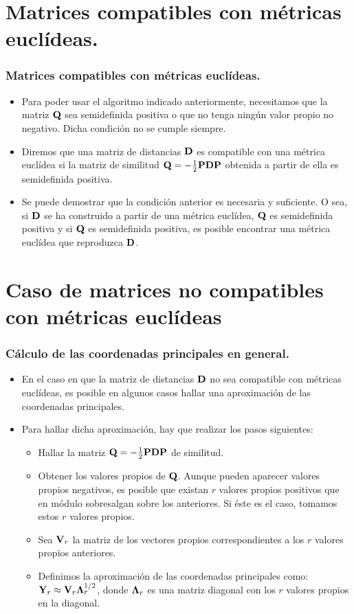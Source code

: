 \section{Matrices compatibles con métricas euclídeas.}
\begin{frame}
\frametitle{Matrices compatibles con métricas euclídeas.}
\begin{itemize}
\item<2->{Para poder usar el algoritmo indicado anteriormente, necesitamos que la matriz $\mathbf{Q}$ sea semidefinida positiva o que no tenga ningún valor propio no negativo. Dicha condición no se cumple siempre.}
\item<3->{Diremos que una matriz de distancias $\mathbf{D}$ es compatible con una métrica euclídea si la matriz de similitud $\mathbf{Q}=-\frac{1}{2}\mathbf{P}\mathbf{D}\mathbf{P}$ obtenida a partir de ella es semidefinida positiva.}
\item<4->{Se puede demostrar que la condición anterior es necesaria y suficiente. O sea, si $\mathbf{D}$ se ha construido a partir de una métrica euclídea, $\mathbf{Q}$ es semidefinida positiva y si $\mathbf{Q}$ es semidefinida positiva, es posible encontrar una métrica euclídea que reproduzca $\mathbf{D}$.}
\end{itemize}
\end{frame}
\section{Caso de matrices no compatibles con métricas euclídeas}
\begin{frame}
\frametitle{Cálculo de las coordenadas principales en general.}
\begin{itemize}
\item<2->{En el caso en que la matriz de distancias $\mathbf{D}$ no sea compatible con métricas euclídeas, es posible en algunos casos hallar una aproximación de las coordenadas principales.}
\item<3->{Para hallar dicha aproximación, hay que realizar los pasos siguientes:}
\begin{itemize}
\item<4->{Hallar la matriz $\mathbf{Q}=-\frac{1}{2}\mathbf{P}\mathbf{D}\mathbf{P}$ de similitud.}
\item<5->{Obtener los valores propios de $\mathbf{Q}$. Aunque pueden aparecer valores propios negativos, es posible que existan $r$ valores propios positivos que en módulo sobresalgan sobre los anteriores. Si éste es el caso, tomamos estos $r$ valores propios.}
\item<6->{Sea $\mathbf{V}_r$ la matriz de los vectores propios correspondientes a los $r$ valores propios anteriores.}
\item<7->{Definimos la aproximación de las coordenadas principales como: $\mathbf{Y}_r \approx \mathbf{V}_r\mathbf{\Lambda}_r^{1/2}$, donde $\mathbf{\Lambda}_r$ es una matriz diagonal con los $r$ valores propios en la diagonal.}
\end{itemize}
\end{itemize}
\end{frame}

